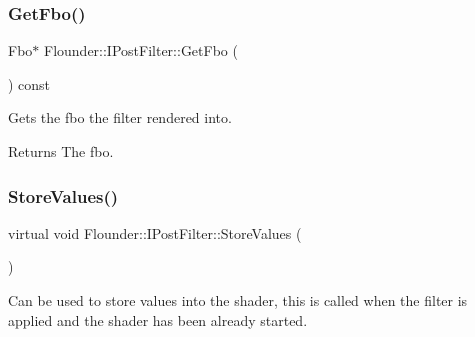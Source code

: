\subsubsection{\texorpdfstring{Get\+Fbo()}{GetFbo()}}
{\footnotesize\ttfamily Fbo$\ast$ Flounder\+::\+I\+Post\+Filter\+::\+Get\+Fbo (\begin{DoxyParamCaption}{ }\end{DoxyParamCaption}) const\hspace{0.3cm}{\ttfamily [inline]}}



Gets the fbo the filter rendered into. 

\begin{DoxyReturn}{Returns}
The fbo. 
\end{DoxyReturn}
\mbox{\label{class_flounder_1_1_i_post_filter_a20420ec0a9bac67437740552bea9ab74}} 
\subsubsection{\texorpdfstring{Store\+Values()}{StoreValues()}}
{\footnotesize\ttfamily virtual void Flounder\+::\+I\+Post\+Filter\+::\+Store\+Values (\begin{DoxyParamCaption}{ }\end{DoxyParamCaption})\hspace{0.3cm}{\ttfamily [pure virtual]}}



Can be used to store values into the shader, this is called when the filter is applied and the shader has been already started. 



